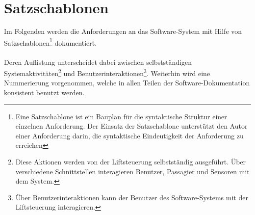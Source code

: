 \newpage
\section{Satzschablonen}
Im Folgenden werden die Anforderungen an das Software-System mit Hilfe von Satzschablonen\footnote{Eine Satzschablone ist ein Bauplan für die syntaktische Struktur einer einzelnen Anforderung. Der Einsatz der Satzschablone unterstützt den Autor einer Anforderung darin, die syntaktische Eindeutigkeit der Anforderung zu erreichen} dokumentiert.

\paragraph{}
Deren Auflistung unterscheidet dabei zwischen selbstständigen Systemaktivitäten\footnote{Diese Aktionen werden von der Liftsteuerung selbstständig ausgeführt. Über verschiedene Schnittstellen interagieren Benutzer, Passagier und Sensoren mit dem System.} und Benutzerinteraktionen\footnote{Über Benutzerinteraktionen kann der Benutzer des Software-Systems mit der Liftsteuerung interagieren.}. Weiterhin wird eine Nummerierung vorgenommen, welche in allen Teilen der Software-Dokumentation konsistent benutzt werden.

